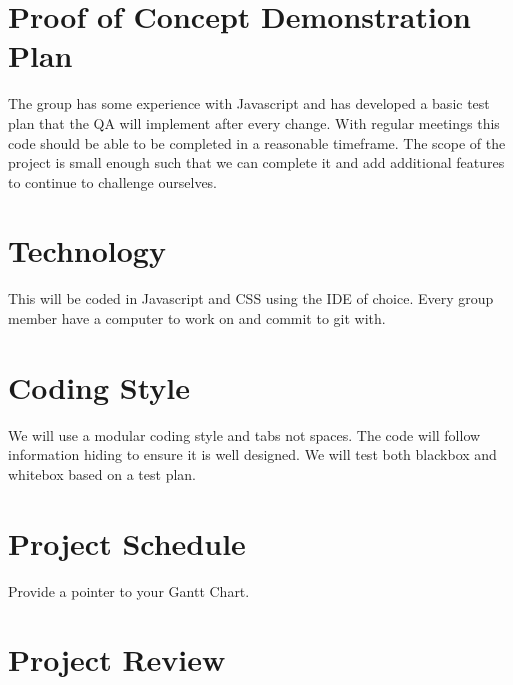 \documentclass{article}
\begin{document}
\section{Proof of Concept Demonstration Plan}
The group has some experience with Javascript and has developed a basic test plan that the QA will implement after every change.
With regular meetings this code should be able to be completed in a reasonable timeframe. 
The scope of the project is small enough such that we can complete it and add additional features to continue to challenge ourselves.
\section{Technology}
This will be coded in Javascript and CSS using the IDE of choice.
Every group member have a computer to work on and commit to git with.
\section{Coding Style}
We will use a modular coding style and tabs not spaces.
The code will follow information hiding to ensure it is well designed.
We will test both blackbox and whitebox based on a test plan.
\section{Project Schedule}
Provide a pointer to your Gantt Chart.
\section{Project Review}
\end{document}
